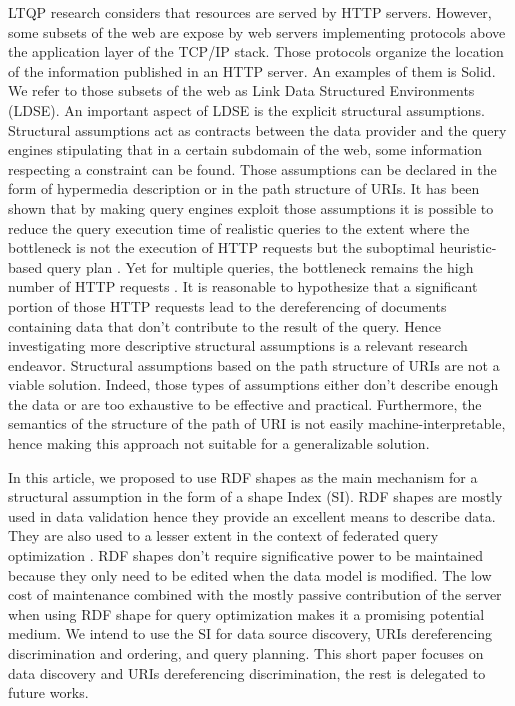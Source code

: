 LTQP research considers that resources are served by HTTP servers.
However, some subsets of the web are expose by web servers implementing protocols above the application layer of the TCP/IP stack.
Those protocols organize the location of the information published in an HTTP server.
An examples of them is Solid.
We refer to those subsets of the web as Link Data Structured Environments (LDSE).
An important aspect of LDSE is the explicit structural assumptions.
Structural assumptions act as contracts between the data provider and 
the query engines stipulating that in a certain subdomain of the web, some information respecting a constraint can be found.
Those assumptions can be declared in the form of hypermedia description \cite{Fielding} or in the path structure of URIs.
It has been shown that by making query engines exploit those assumptions it is possible to reduce the query execution time
of realistic queries to the extent where the bottleneck is not the execution of 
HTTP requests but the suboptimal heuristic-based query plan \cite{eschauzier_quweda_2023, Taelman2023}.
Yet for multiple queries, the bottleneck remains the high number of HTTP requests  \cite{eschauzier_quweda_2023}.
It is reasonable to hypothesize that a significant portion of those HTTP requests lead to the dereferencing of
documents containing data that don't contribute to the result of the query.
Hence investigating more descriptive structural assumptions is a relevant research endeavor.
Structural assumptions based on the path structure of URIs are not a viable solution.
Indeed, those types of assumptions either don't describe enough the data or are too exhaustive to be effective and practical.
Furthermore, the semantics of the structure of the path of URI is not easily machine-interpretable, hence
making this approach not suitable for a generalizable solution.

In this article, we proposed to use RDF shapes as the main mechanism for a structural assumption in the form of a shape Index (SI).
RDF shapes are mostly used in data validation \cite{Gayo2018a} hence they provide an excellent means to describe data.
They are also used to a lesser extent in the context of federated query optimization \cite{kashif2021}.
RDF shapes don't require significative power to be maintained because they only need to be edited 
when the data model is modified.
The low cost of maintenance combined with the mostly passive contribution of 
the server when using RDF shape for query optimization makes it a promising potential medium. 
We intend to use the SI for data source discovery, URIs dereferencing discrimination and ordering, and query planning.
This short paper focuses on data discovery and URIs dereferencing discrimination,
the rest is delegated to future works.
